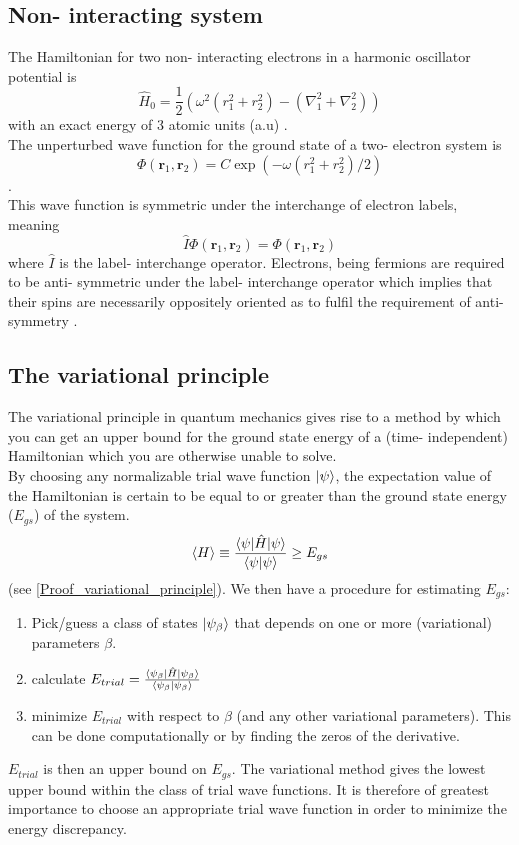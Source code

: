 \documentclass[10pt,a4paper]{article}
\begin{document}
\subsection{Non- interacting system}
The Hamiltonian for two non- interacting electrons in a harmonic oscillator potential is
\begin{equation}
\hat{H}_{0} = \frac{1}{2}\left( \omega^2   \left( r_1^2+r_2^2 \right)-\left( \nabla_1^2 + \nabla_2^2 \right)  \right)
\end{equation}
with an exact energy of 3 atomic units (a.u) \cite{Problem_set_5}.\\The unperturbed wave function for the ground state of a two- electron system is 
\begin{equation*}
\Phi(\mathbf{r}_1,\mathbf{r}_2) = C\exp{\left(-\omega(r_1^2+r_2^2)/2\right)}
\end{equation*}
\cite{Problem_set_5}.\\This wave function is symmetric under the interchange of electron labels, meaning
\begin{equation*}
\hat{I}\Phi(\mathbf{r}_1,\mathbf{r}_2) = \Phi(\mathbf{r}_1,\mathbf{r}_2)
\end{equation*}
where $\hat{I}$ is the label- interchange operator. Electrons, being fermions are required to be anti- symmetric under the label- interchange operator which implies that their spins are necessarily oppositely oriented as to fulfil the requirement of anti- symmetry \cite{griffiths2018introduction}.
\subsection{The variational principle}
The variational principle in quantum mechanics gives rise to a method by which you can get an upper bound for the ground state energy of a (time- independent) Hamiltonian which you are otherwise unable to solve.\\ 
By choosing any normalizable trial wave function $\ket{\psi}$, the expectation value of the Hamiltonian is certain to be equal to or greater than the ground state energy ($E_{gs}$) of the system.
$$
\braket{H}\equiv \frac{\braket{\psi|\hat{H}|\psi}}{\braket{\psi|\psi}} \geq E_{gs}
$$
(see \ref{Proof_variational_principle}). We then have a procedure for estimating $E_{gs}$:
\begin{enumerate}
\item Pick/guess a class of states $\ket{\psi_\beta}$ that depends on one or more (variational) parameters $\beta$.
\item calculate $E_{trial}=\frac{\braket{\psi_\beta|\hat{H}|\psi_\beta}}{\braket{\psi_\beta|\psi_\beta}}$
\item minimize $E_{trial}$ with respect to $\beta$ (and any other variational parameters). This can be done computationally or by finding the zeros of the derivative.
\end{enumerate}
$E_{trial}$ is then an upper bound on $E_{gs}$. The variational method gives the lowest upper bound within the class of trial wave functions. It is therefore of greatest importance to choose an appropriate trial wave function in order to minimize the energy discrepancy.
\end{document}
